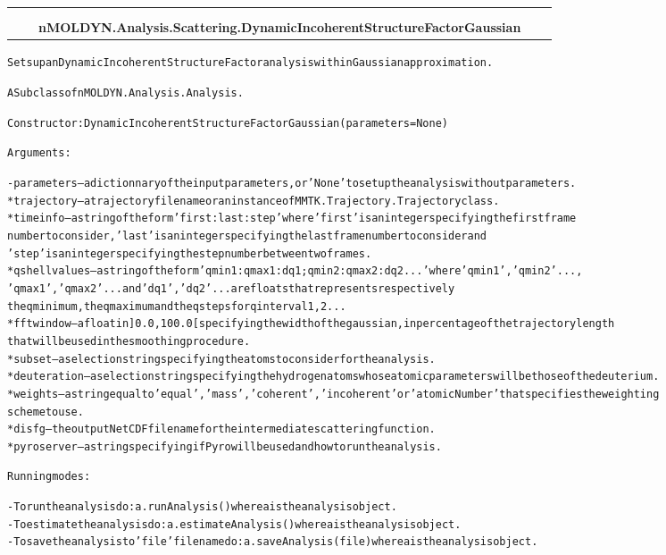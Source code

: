     \label{nMOLDYN:Analysis:Scattering:DynamicIncoherentStructureFactorGaussian}
\begin{tabular}{cccccc}
\multicolumn{2}{r}{\settowidth{\BCL}{nMOLDYN.Analysis.Analysis.Analysis}\multirow{2}{\BCL}{nMOLDYN.Analysis.Analysis.Analysis}}
&&
  \\\cline{3-3}
  &&\multicolumn{1}{c|}{}
&&
  \\
&&\multicolumn{2}{l}{\textbf{nMOLDYN.Analysis.Scattering.DynamicIncoherentStructureFactorGaussian}}
\end{tabular}

\begin{alltt}
Sets up an Dynamic Incoherent Structure Factor analysis within Gaussian approximation.

A Subclass of nMOLDYN.Analysis.Analysis. 

Constructor: DynamicIncoherentStructureFactorGaussian({\textbar}parameters{\textbar} = None)

Arguments:

    - {\textbar}parameters{\textbar} -- a dictionnary of the input parameters, or 'None' to set up the analysis without parameters.
        * trajectory   -- a trajectory file name or an instance of MMTK.Trajectory.Trajectory class.
        * timeinfo     -- a string of the form 'first:last:step' where 'first' is an integer specifying the first frame 
                          number to consider, 'last' is an integer specifying the last frame number to consider and 
                          'step' is an integer specifying the step number between two frames.
        * qshellvalues -- a string of the form 'qmin1:qmax1:dq1;qmin2:qmax2:dq2...' where 'qmin1', 'qmin2' ... , 
                          'qmax1', 'qmax2' ... and 'dq1', 'dq2' ... are floats that represents respectively 
                          the q minimum, the q maximum and the q steps for q interval 1, 2 ...
        * fftwindow    -- a float in ]0.0,100.0[ specifying the width of the gaussian, in percentage of the trajectory length
                          that will be used in the smoothing procedure.
        * subset       -- a selection string specifying the atoms to consider for the analysis.
        * deuteration  -- a selection string specifying the hydrogen atoms whose atomic parameters will be those of the deuterium.
        * weights      -- a string equal to 'equal', 'mass', 'coherent' , 'incoherent' or 'atomicNumber' that specifies the weighting
                          scheme to use.
        * disfg        -- the output NetCDF file name for the intermediate scattering function.
        * pyroserver   -- a string specifying if Pyro will be used and how to run the analysis.
    
Running modes:

    - To run the analysis do: a.runAnalysis() where a is the analysis object.
    - To estimate the analysis do: a.estimateAnalysis() where a is the analysis object.
    - To save the analysis to 'file' file name do: a.saveAnalysis(file) where a is the analysis object.
    
\end{alltt}


